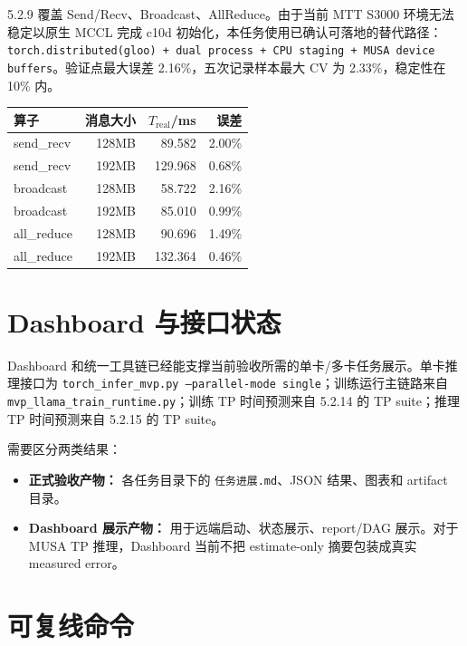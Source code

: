 \documentclass[UTF8,a4paper,11pt]{ctexart}
\begin{document}
5.2.9 覆盖 Send/Recv、Broadcast、AllReduce。由于当前 MTT S3000 环境无法稳定以原生 MCCL 完成 c10d 初始化，本任务使用已确认可落地的替代路径：\texttt{torch.distributed(gloo) + dual process + CPU staging + MUSA device buffers}。验证点最大误差 2.16\%，五次记录样本最大 CV 为 2.33\%，稳定性在 10\% 内。

\begin{center}
\begin{tabular}{lrrr}
\toprule
\textbf{算子} & \textbf{消息大小} & \textbf{$T_{\mathrm{real}}$/ms} & \textbf{误差} \\
\midrule
send\_recv & 128MB & 89.582 & 2.00\% \\
send\_recv & 192MB & 129.968 & 0.68\% \\
broadcast & 128MB & 58.722 & 2.16\% \\
broadcast & 192MB & 85.010 & 0.99\% \\
all\_reduce & 128MB & 90.696 & 1.49\% \\
all\_reduce & 192MB & 132.364 & 0.46\% \\
\bottomrule
\end{tabular}
\end{center}

\section{Dashboard 与接口状态}

Dashboard 和统一工具链已经能支撑当前验收所需的单卡/多卡任务展示。单卡推理接口为 \texttt{torch\_infer\_mvp.py --parallel-mode single}；训练运行主链路来自 \texttt{mvp\_llama\_train\_runtime.py}；训练 TP 时间预测来自 5.2.14 的 TP suite；推理 TP 时间预测来自 5.2.15 的 TP suite。

需要区分两类结果：
\begin{itemize}
  \item \textbf{正式验收产物：} 各任务目录下的 \texttt{任务进展.md}、JSON 结果、图表和 artifact 目录。
  \item \textbf{Dashboard 展示产物：} 用于远端启动、状态展示、report/DAG 展示。对于 MUSA TP 推理，Dashboard 当前不把 estimate-only 摘要包装成真实 measured error。
\end{itemize}

\section{可复线命令}
\end{document}
